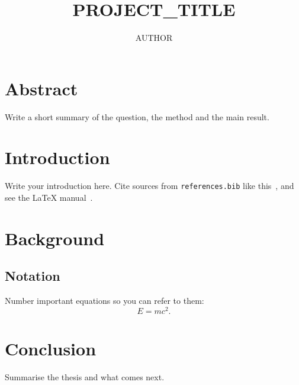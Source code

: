\documentclass[11pt]{aucklandthesis}
\begin{document}
\title{{{PROJECT_TITLE}}}
\subtitle{}
\author{{{AUTHOR}}}
\maketitle

\chapter*{Abstract}
Write a short summary of the question, the method and the main result.

\cleardoublepage\tableofcontents
\cleardoublepage
\setcounter{page}{1}

\chapter{Introduction}
Write your introduction here. Cite sources from \texttt{references.bib} like
this~\cite{einstein1905}, and see the \LaTeX{} manual~\cite{lamport1994}.

\chapter{Background}
\section{Notation}
Number important equations so you can refer to them:
\begin{equation}
  E = mc^2 . \label{eq:energy}
\end{equation}

\chapter{Conclusion}
Summarise the thesis and what comes next.



\end{document}
